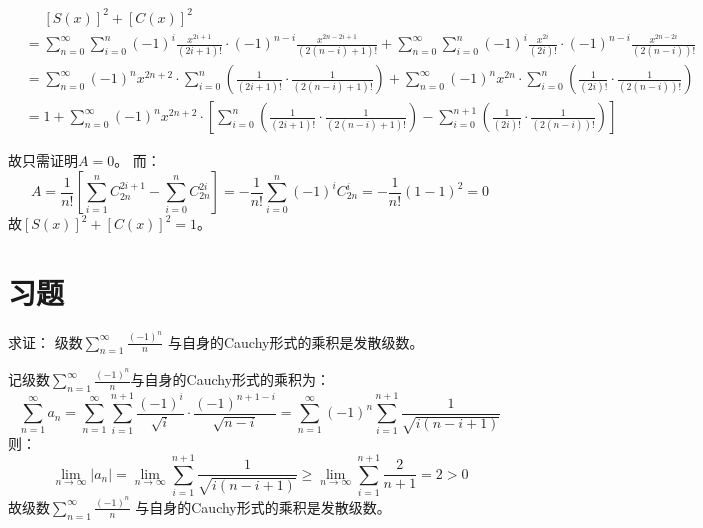 \begin{solution}
    \begin{align*}
        &\mathrel{\phantom{=}} [S(x)]^2+[C(x)]^2\\
        & = \sum_{n=0}^{\infty} \sum_{i=0}^{n} (-1)^{i}
        \frac{x^{2i+1}}{(2i+1)!} \cdot (-1)^{n-i}
        \frac{x^{2n-2i+1}}{(2(n-i)+1)!}
        + \sum_{n=0}^{\infty} \sum_{i=0}^{n} (-1)^{i}
        \frac{x^{2i}}{(2i)!} \cdot (-1)^{n-i} \frac{x^{2n -
        2i}}{(2(n-i))!}      \\
        & = \sum_{n=0}^{\infty} (-1)^n x^{2n+2} \cdot \sum_{i=0}^{n}
        \left( \frac{1}{(2i+1)!} \cdot \frac{1}{(2(n-i)+1)!} \right) +
        \sum_{n=0}^{\infty} (-1)^n x^{2n} \cdot \sum_{i=0}^{n}
        \left( \frac{1}{(2i)!} \cdot \frac{1}{(2(n-i))!} \right)
        \\
        & = 1 + \sum_{n=0}^{\infty} (-1)^n x^{2n+2}
        \cdot
        \left[ \sum_{i=0}^{n} \left( \frac{1}{(2i+1)!} \cdot
            \frac{1}{(2(n-i)+1)!} \right)
            - \sum_{i=0}^{n+1} \left( \frac{1}{(2i)!} \cdot
        \frac{1}{(2(n-i))!} \right) \right]
    \end{align*}

    故只需证明\(A=0\)。
    而：
    \[
        A=\frac{1}{n!}\left[ \sum_{i=1}^{n} C^{2i+1}_{2n} -
        \sum_{i=0}^{n} C^{2i}_{2n} \right] = - \frac{1}{n!}
        \sum_{i=0}^{n} (-1)^i C^{i}_{2n} =
        - \frac{1}{n!} \left( 1 - 1 \right)^2
        =0
    \]
    故\([S(x)]^2+[C(x)]^2=1\)。
\end{solution}
\section{习题}
\begin{problem}
    求证： 级数\(\sum_{n=1}^{\infty} \frac{(-1)^n}{n}\)
    与自身的Cauchy形式的乘积是发散级数。
\end{problem}

\begin{solution}
    记级数\(\sum_{n=1}^{\infty} \frac{(-1)^n}{n}\)与自身的Cauchy形式的乘积为：
    \[
        \sum_{n=1}^{\infty} a_n =
        \sum_{n=1}^{\infty} \sum_{i=1}^{n+1} \frac{(-1)^i}{\sqrt{i}}
        \cdot \frac{(-1)^{n+1-i}}{\sqrt{n-i}} =
        \sum_{n=1}^{\infty} (-1)^n \sum_{i=1}^{n+1}
        \frac{1}{\sqrt{i(n-i+1)}}
    \]
    则：
    \[
        \lim_{n \to \infty} \left\vert a_n \right\vert
        = \lim_{n \to \infty} \sum_{i=1}^{n+1}
        \frac{1}{\sqrt{i(n-i+1)}}
        \ge \lim_{n \to \infty} \sum_{i=1}^{n+1} \frac{2}{n+1} = 2
        > 0
    \]
    故级数\(\sum_{n=1}^{\infty} \frac{(-1)^n}{n}\) 与自身的Cauchy形式的乘积是发散级数。
\end{solution}

